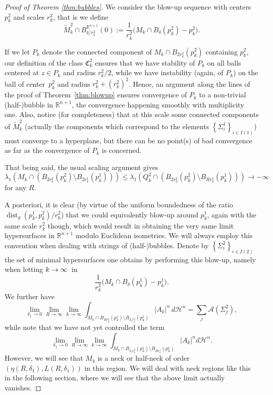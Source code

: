\documentclass[JEP,XML,SOM,Unicode]{cedram}
\let\mathcal\mathscr
\DeclareMathOperator{\dist}{dist}
\theoremstyle{definition}
\newcommand{\R}{\mathbb{R}}
\newcommand{\h}{\mathscr{H}}
\begin{document}
\begin{proof}[Proof of Theorem \ref{thm:bubbles}]
We consider the blow-up sequence with centers $p^2_k$ and scales $r^2_k$, that is we define
\begin{equation*}
\widetilde{M}_k^2 \cap B^{\R^{n+1}}_{\delta/r^2_k}(0) := \frac{1}{r^2_k}\big(M_k\cap B_\delta(p^2_k)- p^2_k\big).
\end{equation*}

If we let $P_k$ denote the connected component of $M_k\cap B_{2r^2_k}(p^2_k)$ containing $p^2_k$, our definition of the class $\mathfrak{C}^2_k$ ensures that we have stability of $P_k$ on all balls centered at $z\in P_k$ and radius $r^2_k/2$, while we have instability (again, of $P_k$) on the ball of center~$p^2_k$ and radius $r^2_k+(r^2_k)^2$. Hence, an argument along the lines of the proof of Theorem~\ref{thm:blowup} ensures convergence of $P_k$ to a non-trivial (half-)bubble in $\R^{n+1}$, the convergence happening smoothly with multiplicity one. Also, notice (for completeness) that
at this scale some connected components of $\widetilde{M}_k^2$ (actually the components which correspond to the elements $\left\{\Sigma^1_i\right\}_{i\in I(1)}$) must converge to a hyperplane, but there can be no point(s) of bad convergence as far as the convergence of $P_k$ is concerned.

That being said, the usual scaling argument gives $$\lambda_1(M_k\cap(B_{2r^2_k}(p^2_k)\setminus B_{2r^1_k}(p^1_k)))\leq \lambda_1(Q^2_k\cap(B_{2r^2_k}(p^2_k)\setminus B_{Rr^1_k}(p^1_k)))\to -\infty$$ for any $R$.

A posteriori, it is clear (by virtue of the uniform boundedness of the ratio $\dist_g(p_k^1,p_k^2)/r^2_k$) that we could equivalently blow-up around $p^1_k$, again with the same scale $r^2_k$ though, which would result in obtaining the very same limit hypersurfaces in $\R^{n+1}$ modulo Euclidean isometries. We will always employ this convention when dealing with strings of (half-)bubbles.
Denote by $\left\{\Sigma^2_i \right\}_{i\in I(2)}$ the set of minimal hypersurfaces one obtains by performing this blow-up, namely when letting $k\to\nobreak\infty$~in
\[
\frac{1}{r^2_k}\big(M_k\cap B_\delta(p^1_k)- p^1_k\big).
\]
We further have
\begin{equation}\label{eq.secbubble2}
\lim_{\delta_1\to 0}\lim_{R\to \infty}\lim_{k\to \infty} \int_{M_k\cap B_{Rr^2_k}(p^1_k)\setminus B_{\delta_1 r^2_k}(p^1_k)} |A_k|^n \,d\h^n = \sum_j \mathcal{A}(\Sigma^2_j),
\end{equation}
while note that we have not yet controlled the term
\begin{equation}\label{eq.neck1}
\lim_{\delta_1\to 0}\lim_{R\to \infty}\lim_{k\to \infty}\int_{M_k\cap B_{\delta_1 r^2_k}(p^1_k)\setminus B_{Rr^1_k}(p^1_k)} |A_k|^n d \h^n.
\end{equation}
However, we will see that $M_k$ is a neck or half-neck of order $(\eta (R,\delta_1), L(R,\delta_1))$ in this region. We will deal with neck regions like this in the following section, where we will see that the above limit actually vanishes.


\end{proof}
\end{document}
